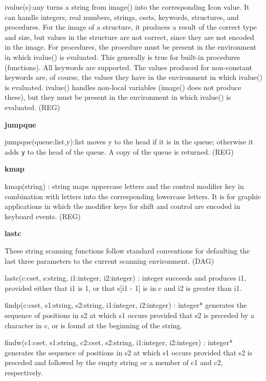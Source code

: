 \textsf{ivalue(s):any} turns a string from \textsf{image()} into the
corresponding Icon value. It can handle integers, real numbers,
strings, csets, keywords, structures, and procedures. For the image of
a structure, it produces a result of the correct type and size, but
values in the structure are not correct, since they are not encoded in
the image. For procedures, the procedure must be present in the
environment in which \textsf{ivalue()} is evaluated. This generally is
true for built-in procedures (functions). All keywords are supported.
The values produced for non-constant keywords are, of course, the
values they have in the environment in which \textsf{ivalue()} is
evaluated. \textsf{ivalue()} handles non-local variables
(\textsf{image()} does not produce these), but they must be present in
the environment in which \textsf{ivalue()} is evaluated. (REG)

{\sffamily\bfseries
jumpque}

\textsf{jumpque(}\textsf{queue}\textsf{:list,y):list} moves
\textsf{y} to the head if it is in the queue; otherwise it adds
\texttt{y} to the head of the queue. A copy of the queue is returned.
(REG)

{\sffamily\bfseries
kmap}

\textsf{kmap(string) : string} maps uppercase letters and the control
modifier key in combination with letters into the corresponding
lowercase letters. It is for graphic applications in which the modifier
keys for shift and control are encoded in keyboard
events. (REG)

{\sffamily\bfseries
lastc}

These string scanning functions follow standard conventions for
defaulting the last three parameters to the current scanning
environment. (DAG)

\textsf{lastc(c:cset, s:string, i1:integer, i2:integer) : integer}
succeeds and produces \textsf{i1}, provided either that \textsf{i1} is
\textsf{1}, or that \textsf{s[i1 - 1]} is in \textsf{c} and \textsf{i2}
is greater than \textsf{i1}.

\textsf{findp(c:cset, s1:string, s2:string, i1:integer, i2:integer) :
integer*} generates the sequence of positions in \textsf{s2} at which
\textsf{s1} occurs provided that \textsf{s2} is preceded by a character
in \textsf{c}, or is found at the beginning of the string.

\textsf{findw(c1:cset, s1:string, c2:cset, s2:string, i1:integer,
i2:integer) : integer*} generates the sequence of positions in
\textsf{s2} at which \textsf{s1} occurs provided that \textsf{s2} is
preceded and followed by the empty string or a member of \textsf{c1}
and \textsf{c2, respectively}.


